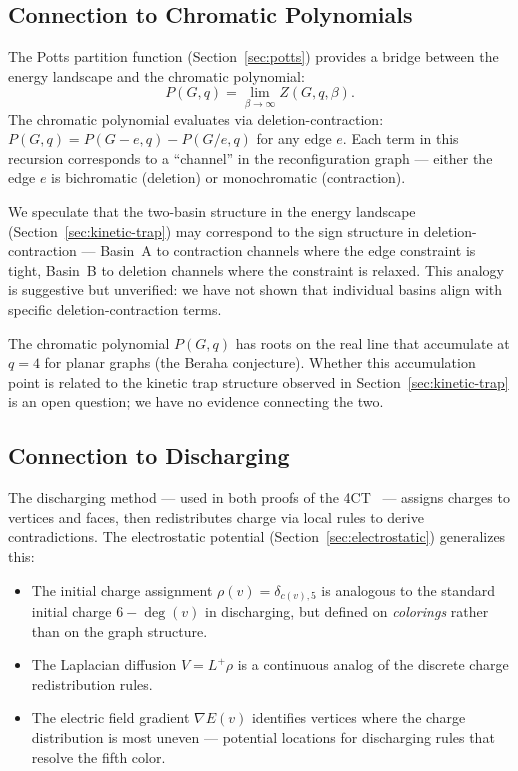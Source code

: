 \subsection{Connection to Chromatic Polynomials}
\label{sec:chromatic}

The Potts partition function
(Section~\ref{sec:potts}) provides a bridge between the energy
landscape and the chromatic polynomial:
\begin{equation}\label{eq:potts-bridge}
  P(G, q) = \lim_{\beta \to \infty} Z(G, q, \beta).
\end{equation}
The chromatic polynomial evaluates via deletion-contraction:
$P(G, q) = P(G - e, q) - P(G / e, q)$ for any edge $e$. Each term in
this recursion corresponds to a ``channel'' in the reconfiguration
graph — either the edge $e$ is bichromatic (deletion) or monochromatic
(contraction).

We speculate that the two-basin structure in the energy landscape
(Section~\ref{sec:kinetic-trap}) may correspond to the sign structure
in deletion-contraction — Basin~A to contraction channels where the
edge constraint is tight, Basin~B to deletion channels where the
constraint is relaxed. This analogy is suggestive but unverified: we
have not shown that individual basins align with specific
deletion-contraction terms.

\begin{remark}
The chromatic polynomial $P(G, q)$ has roots on the real line that
accumulate at $q = 4$ for planar graphs (the Beraha conjecture). Whether
this accumulation point is related to the kinetic trap structure observed
in Section~\ref{sec:kinetic-trap} is an open question; we have no
evidence connecting the two.
\end{remark}

\subsection{Connection to Discharging}\label{sec:discharging}

The discharging method — used in both proofs of the
4CT~\cite{appel1977, robertson1997} — assigns charges to vertices and
faces, then redistributes charge via local rules to derive
contradictions. The electrostatic potential
(Section~\ref{sec:electrostatic}) generalizes this:

\begin{itemize}
  \item The initial charge assignment $\rho(v) = \delta_{c(v), 5}$ is
    analogous to the standard initial charge $6 - \deg(v)$ in
    discharging, but defined on \emph{colorings} rather than on the
    graph structure.
  \item The Laplacian diffusion $V = L^+ \rho$ is a continuous analog
    of the discrete charge redistribution rules.
  \item The electric field gradient $\nabla E(v)$ identifies vertices
    where the charge distribution is most uneven — potential locations
    for discharging rules that resolve the fifth color.
\end{itemize}

